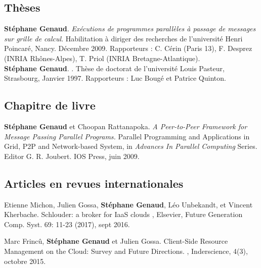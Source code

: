 \small

\begin{thebibliography}{99}

\subsection*{Thèses}

\textbf{Stéphane Genaud}.
\newblock 
{\em Exécutions de programmes parallèles à passage de messages sur grille de 
calcul}.
\newblock 
Habilitation à diriger des recherches de l'université Henri Poincaré, 
Nancy. Décembre 2009.
\newblock 
Rapporteurs : C. Cérin (Paris 13), F. Desprez (INRIA Rhônes-Alpes), 
T. Priol (INRIA Bretagne-Atlantique).\\[2mm]

\textbf{Stéphane Genaud}.
.
\newblock Thèse de doctorat de l'université Louis Pasteur, Strasbourg, Janvier 1997.
\newblock Rapporteurs : Luc Bougé et Patrice Quinton. 

\subsection*{Chapitre de livre}

\textbf{Stéphane Genaud} et Choopan Rattanapoka.
\newblock 
\emph{A Peer-to-Peer Framework for Message Passing Parallel Programs.}
\newblock 
Parallel Programming and Applications in Grid, P2P and Network-based System,
in {\em Advances In Parallel Computing} Series. Editor G. R. Joubert.
IOS Press, juin 2009. 
 

\subsection*{Articles en revues internationales}

\setlength{\itemsep}{1.5mm}

\newblock Etienne Michon, Julien Gossa, \textbf{Stéphane Genaud}, Léo Unbekandt, et Vincent Kherbache.
\newblock Schlouder: a broker for IaaS clouds
, Elsevier, Future Generation Comp. Syst. 69: 11-23 (2017), sept 2016.


\newblock Marc Frincû, \textbf{Stéphane Genaud} et Julien Gossa.
\newblock Client-Side Resource Management on the Cloud: Survey and Future Directions.
, Inderscience, 4(3), octobre 2015.



\end{thebibliography}
